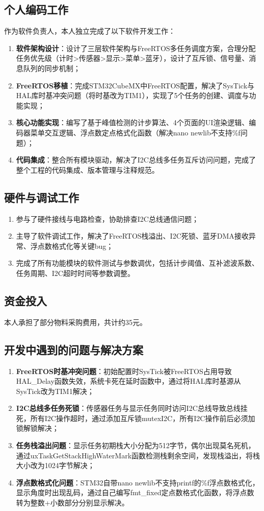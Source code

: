 \documentclass[12pt, a4paper]{ctexart}
\begin{document}
\subsection{个人编码工作}
作为软件负责人，本人独立完成了以下软件开发工作：
\begin{enumerate}
    \item \textbf{软件架构设计}：设计了三层软件架构与FreeRTOS多任务调度方案，合理分配任务优先级（计时>传感器>显示>菜单>蓝牙），设计了互斥锁、信号量、消息队列的同步机制；
    \item \textbf{FreeRTOS移植}：完成STM32CubeMX中FreeRTOS配置，解决了SysTick与HAL库时基冲突问题（将时基改为TIM1），实现了5个任务的创建、调度与功能实现；
    \item \textbf{核心功能实现}：编写了基于峰值检测的计步算法、4个页面的UI渲染逻辑、编码器菜单交互逻辑、浮点数定点格式化函数（解决nano newlib不支持\%f问题）；
    \item \textbf{代码集成}：整合所有模块驱动，解决了I2C总线多任务互斥访问问题，完成了整个工程的代码集成、版本管理与注释规范。
\end{enumerate}

\subsection{硬件与调试工作}
\begin{enumerate}
    \item 参与了硬件接线与电路检查，协助排查I2C总线通信问题；
    \item 主导了软件调试工作，解决了FreeRTOS栈溢出、I2C死锁、蓝牙DMA接收异常、浮点数格式化等关键bug；
    \item 完成了所有功能模块的软件测试与参数调优，包括计步阈值、互补滤波系数、任务周期、I2C超时时间等参数调整。
\end{enumerate}

\subsection{资金投入}
本人承担了部分物料采购费用，共计约35元。

\subsection{开发中遇到的问题与解决方案}
\begin{enumerate}
    \item \textbf{FreeRTOS时基冲突问题}：初始配置时SysTick被FreeRTOS占用导致HAL\_Delay函数失效，系统卡死在延时函数中，通过将HAL库时基源从SysTick改为TIM1解决；
    \item \textbf{I2C总线多任务死锁}：传感器任务与显示任务同时访问I2C总线导致总线挂死，所有I2C操作超时，通过添加互斥锁mutexI2C，所有I2C操作前后必须加锁解锁解决；
    \item \textbf{任务栈溢出问题}：显示任务初期栈大小分配为512字节，偶尔出现莫名死机，通过uxTaskGetStackHighWaterMark函数检测栈剩余空间，发现栈溢出，将栈大小改为1024字节解决；
    \item \textbf{浮点数格式化问题}：STM32自带nano newlib不支持printf的\%f浮点数格式化，显示角度时出现乱码，通过自己编写fmt\_fixed定点数格式化函数，将浮点数转为整数+小数部分分别显示解决。
\end{enumerate}
\end{document}
